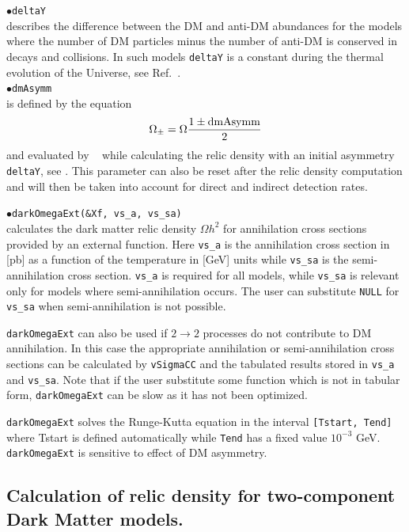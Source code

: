 \documentclass[12pt,a4paper]{article}
\begin{document}
\noindent
$\bullet$\verb|deltaY|\\
describes the difference between the DM and anti-DM abundances for the
models where the number of DM particles minus the number of anti-DM is conserved in
decays and collisions. In such models \verb|deltaY| is a
constant during the thermal evolution of the Universe,   see Ref.~\cite{Belanger:2013oya}.\\
\noindent
$\bullet$\verb|dmAsymm|\\
is defined by the equation 
$$ \Omega_{\pm} = \Omega \frac{1 \pm {\rm dmAsymm}}{2}$$
and evaluated  by \micro~ while calculating the relic density  with an
initial asymmetry \verb|deltaY|, see \cite{Belanger:2013oya}. 
This parameter can also be reset  after the relic density 
computation and will then be taken into account for direct and 
indirect detection rates.

\noindent
$\bullet$\verb|darkOmegaExt(&Xf, vs_a, vs_sa)|\\
calculates the dark matter relic density $\Omega h^2$  
for  annihilation cross sections  provided by an external 
function. Here  \verb|vs_a| is the  annihilation cross section in [pb] as 
a function of the temperature in [GeV] units while  \verb|vs_sa| 
is the semi-annihilation cross section.  \verb|vs_a| is required for all models, 
while \verb|vs_sa| is relevant only for models where semi-annihilation occurs.  The user 
can  substitute {\tt NULL} for \verb|vs_sa| when semi-annihilation is not possible.
 
 {\tt darkOmegaExt}   can also be used 
if $ 2 \to 2$ processes do not contribute  to DM  annihilation. In this case the appropriate annihilation or  semi-annihilation
cross sections can be calculated by {\tt vSigmaCC} and the tabulated results stored in \verb|vs_a| and \verb|vs_sa|. Note that if the user substitute some function which is not in tabular form, {\tt darkOmegaExt} can be  slow as it has not been optimized. 

 {\tt darkOmegaExt} solves  the Runge-Kutta equation in the interval {\tt [Tstart, Tend]} 
 where Tstart is defined automatically while {\tt Tend} has a fixed
value $10^{-3}$ GeV.  {\tt darkOmegaExt} is sensitive to effect of DM
asymmetry.
 

\subsection{Calculation of relic density for  two-component Dark Matter models.}
\end{document}
